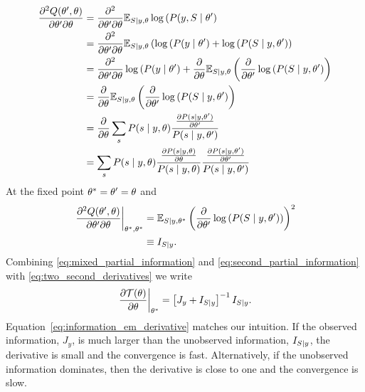 \begin{align}
  \nonumber
  \frac{\partial^2 Q(\NewParameters,  \OldParameters)}{\partial \NewParameters \partial
  \OldParameters}
  &= \frac{\partial^2}{\partial \NewParameters \partial \OldParameters} \EV_{S \given y, \OldParameters}
    \log \left( P(y, S \given \NewParameters \right) \\
  \nonumber
  &= \frac{\partial^2}{\partial \NewParameters \partial \OldParameters} \EV_{S \given y, \OldParameters}
    \left( \log \left( P(y \given \NewParameters \right) + \log \left( P(S
    \given y, \NewParameters \right) \right)\\
  \nonumber
  &= \frac{\partial^2}{\partial \NewParameters \partial \OldParameters} \log \left( P(y \given
    \NewParameters \right) + \frac{\partial}{\partial \OldParameters} \EV_{S \given y, \OldParameters} \left(
    \frac{\partial}{\partial \NewParameters} \log \left( P(S \given y,
    \NewParameters \right) \right) \\
  \nonumber
  &=  \frac{\partial}{\partial \OldParameters} \EV_{S \given y, \OldParameters} \left(
    \frac{\partial}{\partial \NewParameters} \log \left( P(S \given y,
    \NewParameters \right) \right) \\
  \nonumber
  &= \frac{\partial}{\partial \OldParameters} \sum_s P(s \given y, \OldParameters) %
    \frac{ %
    \frac{\partial P(s \given y,\NewParameters )}{\partial \NewParameters}
    }{P(s \given y,\NewParameters )}  \\
  \nonumber
  &= \sum_s P(s \given y, \OldParameters) %
    \frac{ %
    \frac{\partial P(s \given y,\OldParameters )}{\partial \OldParameters}
    }{P(s \given y,\OldParameters )}
    \frac{ %
    \frac{\partial P(s \given y,\NewParameters )}{\partial \NewParameters}
    }{P(s \given y,\NewParameters )}
\end{align}
At the fixed point ${\theta^*} = \theta' = \theta$
and
\begin{align}
  \label{eq:score_fisher}
  \left. \frac{\partial^2 Q(\theta',  \theta)}{\partial \theta'
  \partial \theta} \right|_{{\theta^*}, {\theta^*}}
  &= \mathbb{E}_{S \mid y, {\theta^*}} \left( \frac{\partial}{\partial
    \theta'} \log \left( P(S \mid y, \theta' )\right) \right)^2\\
  \label{eq:mixed_partial_information}
  &\equiv I_{S \mid y}.
\end{align}
Combining \eqref{eq:mixed_partial_information} and
\eqref{eq:second_partial_information} with
\eqref{eq:two_second_derivatives} we write
\begin{equation}
  \label{eq:information_em_derivative}
  \left.\frac{\partial \EMmap(\parameters)}{\partial \parameters}
  \right|_{\EMfixedPoint} = \left[J_y + I_{S \given y}  \right]^{-1}
  I_{S \given y}.
\end{equation}
Equation~\eqref{eq:information_em_derivative} matches our intuition.
If the observed information, $J_y$, is much larger than the unobserved
information, $I_{S \mid y}$, the derivative is small and the
convergence is fast.  Alternatively, if the unobserved information
dominates, then the derivative is close to one and the convergence is
slow.

